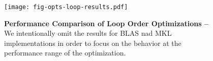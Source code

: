 
\begin{figure}[b]

  \centering
  \texttt{[image: fig-opts-loop-results.pdf]}

  \caption{\textbf{Performance Comparison of Loop Order Optimizations --}
    We intentionally omit the results for BLAS nad MKL implementations in
    order to focus on the behavior at the performance range of the
    optimization.}

  \label{fig-opts-loop-results}

\end{figure}
